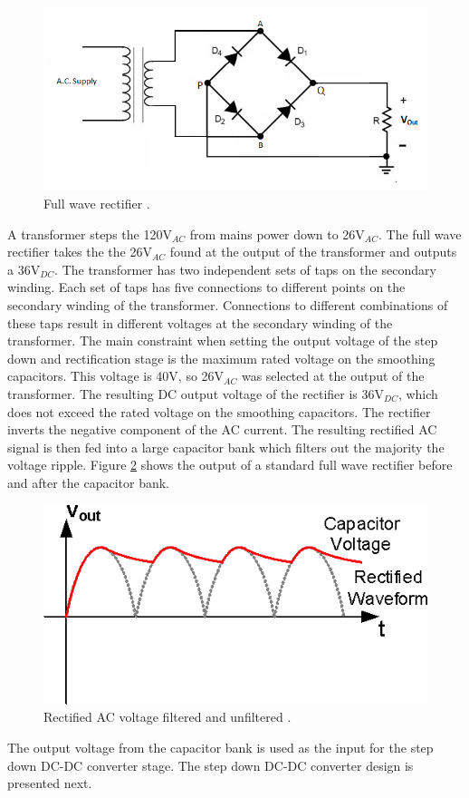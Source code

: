 \documentclass[11pt]{article}
\begin{document}
        \begin{figure}[H]
            \centering
            \includegraphics[width=0.5\linewidth]{fullwaverectifiercircuit.png}
            \caption{Full wave rectifier \cite{efy_group_half_207}.}
            \label{fig:Full Wave Rectifier}
            
        \end{figure}
         \noindent A transformer steps the 120V$_{AC}$ from mains power down to 26V$_{AC}$. The full wave rectifier takes the the 26V$_{AC}$ found at the output of the transformer and outputs a 36V$_{DC}$. The transformer has two independent sets of taps on the secondary winding. Each set of taps has five connections to different points on the secondary winding of the transformer. Connections to different combinations of these taps result in different voltages at the secondary winding of the transformer. The main constraint when setting the output voltage of the step down and rectification stage is the maximum rated voltage on the smoothing capacitors. This voltage is 40V, so 26V$_{AC}$ was selected at the output of the transformer. The resulting DC output voltage of the rectifier is 36V$_{DC}$, which does not exceed the rated voltage on the smoothing capacitors.
         \newline
         \newline
         \noindent The rectifier inverts the negative component of the AC current. The resulting rectified AC signal is then fed into a large capacitor bank which filters out the majority the voltage ripple. Figure \ref{cap} shows the output of a standard full wave rectifier before and after the capacitor bank. 
         \begin{figure}[H]
            \centering
            \includegraphics[width=0.6\linewidth]{2_16_0_12_eng.png}
            \caption{Rectified AC voltage filtered and unfiltered \cite{macao_communications_rectified_2012}.}
            \label{cap}
        \end{figure}
        \noindent The output voltage from the capacitor bank is used as the input for the step down DC-DC converter stage. The step down DC-DC converter design is presented next.
        
\end{document}
